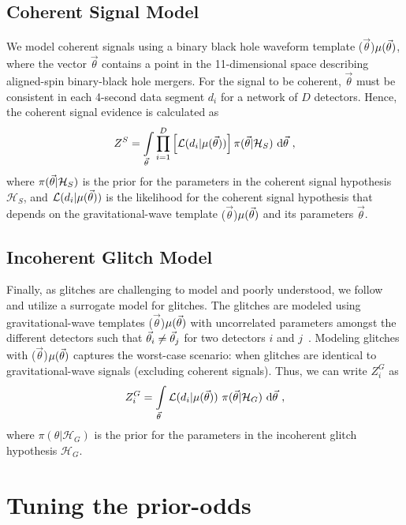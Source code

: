 \documentclass[useAMS,fleqn, usenatbib, final]{mnras}
\newcommand{\mathcmd}[1]{{\sc \relax\ifmmode#1\else $#1$\fi}\xspace}
\newcommand{\parameters}{\mathcmd{\vec{\theta}}}
\newcommand{\template}{\mathcmd{\mu(\parameters)}}
\begin{document}
\subsection{Coherent Signal Model}
We model coherent signals using a binary black hole waveform template \template, where the vector \parameters contains a point in the 11-dimensional space describing aligned-spin binary-black hole mergers. For the signal to be coherent, \parameters must be consistent in each 4-second data segment $d_i$ for a network of $D$ detectors. Hence, the coherent signal evidence is calculated as
\begin{equation}
\label{eq:zs}
Z^S = \int\limits_{\parameters} \prod\limits^{D}_{i=1} \left[ \mathcal{L}(d_i|\template)\right] \pi(\parameters | \mathcal{H}_S)\  \text{d}\parameters \ ,
\end{equation}
where $\pi(\parameters| \mathcal{H}_S)$ is the prior for the parameters in the coherent signal hypothesis $\mathcal{H}_S$, and $\mathcal{L}(d_i|\template)$ is the likelihood for the coherent signal hypothesis that depends on the gravitational-wave template \template and its parameters \parameters. 

\subsection{Incoherent Glitch Model}
Finally, as glitches are challenging to model and poorly understood, we follow \citet{bci} and utilize a surrogate model for glitches. The glitches are modeled using gravitational-wave templates  \template with uncorrelated parameters amongst the different detectors such that  $\parameters_i \neq \parameters_j$ for two detectors $i$ and $j$~\citep{bci}.  Modeling glitches with \template captures the worst-case scenario: when glitches are identical to gravitational-wave signals (excluding coherent signals). Thus, we can write $Z^G_i$ as 
\begin{equation}
\label{eq:zg}
Z^G_i = \int\limits_{\parameters} \mathcal{L}(d_i|\template)\ \pi(\parameters| \mathcal{H}_G)\  \text{d}\parameters  \ ,
\end{equation}
where $\pi(\theta| \mathcal{H}_G)$ is the prior for the parameters in the incoherent glitch hypothesis $\mathcal{H}_G$. 



\section{Tuning the prior-odds}\label{apdx:tuning-prior-odds}
\end{document}

